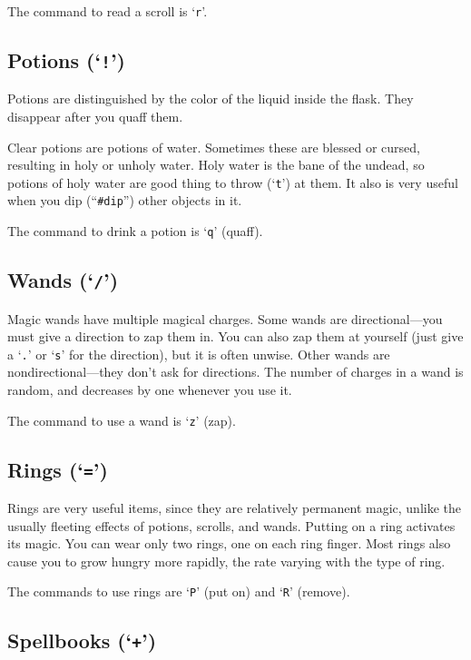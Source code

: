 The command to read a scroll is `{\tt r}'.

\subsection*{Potions (`{\tt !}')}

Potions are distinguished by the color of the liquid inside the flask.
They disappear after you quaff them.

Clear potions are potions of water.  Sometimes these are
blessed or cursed, resulting in holy or unholy water.  Holy water is
the bane of the undead, so potions of holy water are good thing to
throw (`{\tt t}') at them.  It also is very useful when you dip
(``{\tt \#dip}'') other
objects in it.

The command to drink a potion is `{\tt q}' (quaff).

\subsection*{Wands (`{\tt /}')}

Magic wands have multiple magical charges.  Some wands are
directional---you must give a direction to zap them in.  You can also
zap them at yourself (just give a `{\tt .}' or `{\tt s}' for the direction),
but it is often unwise.  Other wands are nondirectional---they don't ask
for directions.  The number of charges in a wand is random, and
decreases by one whenever you use it.

The command to use a wand is `{\tt z}' (zap).

\subsection*{Rings (`{\tt =}')}

Rings are very useful items, since they are relatively permanent
magic, unlike the usually fleeting effects of potions, scrolls, and
wands.
Putting on a ring activates its magic.  You can wear only two
rings, one on each ring finger.
Most rings also cause you to grow hungry more rapidly, the rate
varying with the type of ring.

The commands to use rings are `{\tt P}' (put on) and `{\tt R}' (remove).

\subsection*{Spellbooks (`{\tt +}')}

